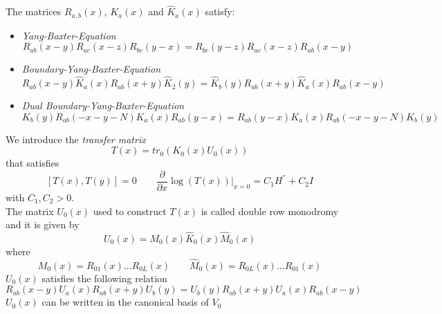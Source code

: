 \documentclass[10pt]{article}
\numberwithin{equation}{section}
\numberwithin{equation}{subsection}
\begin{document}
The matrices $R_{a,b}(x)$, $K_{a}(x)$ and $\widehat{K}_{a}(x)$ satisfy:
\begin{itemize}
	\item \textit{Yang-Baxter-Equation}
	\begin{equation}
		R_{ab}(x-y)R_{ac}(x-z)R_{bc}(y-x)=R_{bc}(y-z)R_{ac}(x-z)R_{ab}(x-y)
	\end{equation}
	\item \textit{Boundary-Yang-Baxter-Equation}
	\begin{equation}
		R_{ab}(x-y)\widehat{K}_{a}(x)R_{ab}(x+y)\widehat{K}_{2}(y)=\widehat{K}_{b}(y)R_{ab}(x+y)\widehat{K}_{a}(x)R_{ab}(x-y)
	\end{equation}
	\item \textit{Dual Boundary-Yang-Baxter-Equation}
	\begin{equation}
		K_{b}(y) R_{ab}(-x-y-N) K_{a}(x)R_{ab}(y-x)=R_{ab}(y-x)K_{a}(x)R_{ab}(-x-y-N)K_{b}(y)
	\end{equation}
\end{itemize}
We introduce the \textit{transfer matrix}
\begin{equation}
	T(x)=tr_{0}\left(K_{0}(x)U_{0}(x)\right)
\end{equation}
that satisfies
\begin{equation}
	\left[T(x),T(y)\right]=0\qquad \frac{\partial}{\partial x}\log (T(x))\lvert_{x=0}=C_{1}H^{''}+C_{2}I
\end{equation}
with $C_{1},C_{2}>0$. \\
The matrix $U_{0}(x)$ used to construct $T(x)$ is called double row monodromy and it is given by
\begin{equation}
	U_{0}(x)=M_{0}(x)\widehat{K}_{0}(x)\widehat{M}_{0}(x)
\end{equation}
where 
\begin{equation}
	M_{0}(x)=R_{01}(x)\ldots R_{0L}(x)\qquad \widehat{M}_{0}(x)=R_{0L}(x)\ldots R_{01}(x)
\end{equation}
$U_{0}(x)$ satisfies the following relation
\begin{equation}\label{RURU}
	R_{ab}(x-y)U_{a}(x)R_{ab}(x+y)U_{b}(y)=U_{b}(y)R_{ab}(x+y)U_{a}(x)R_{ab}(x-y)
\end{equation}
 $U_{0}(x)$ can be written in the canonical basis of $V_{0}$ 

\end{document}
